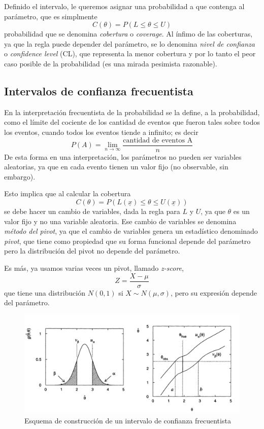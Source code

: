 \documentclass{article}
\numberwithin{equation}{section} %
\begin{document}
Definido el intervalo, le queremos asignar una probabilidad a que contenga al parámetro, que es simplmente
\begin{equation}
C(\theta) = P(L \leq \theta \leq U)
\end{equation}
probabilidad que se denomina \emph{cobertura} o \emph{coverage}. Al ínfimo de las coberturas, ya que la regla puede depender del parámetro, se lo denomina \emph{nivel de confianza} o \emph{confidence level} (CL), que representa la menor cobertura y por lo tanto el peor caso posible de la probabilidad (es una mirada pesimista razonable). 

\subsection{Intervalos de confianza frecuentista}
En la interpretación frecuentista de la probabilidad se la define, a la probabilidad, como el límite del cociente de los cantidad de eventos que fueron tales sobre todos los eventos, cuando todos los eventos tiende a infinito; es decir
\begin{equation}
P(A) = \lim_{n \to \infty} \frac{\text{cantidad de eventos A}}{n}
\end{equation}
De esta forma en una interpretación, los parámetros no pueden ser variables aleatorias, ya que en cada evento tienen un valor fijo (no observable, sin embargo).

Esto implica que al calcular la cobertura
\[C(\theta) = P(L(\underline{x}) \leq \theta \leq U(\underline{x}))\]
se debe hacer un cambio de variables, dada la regla para $L$ y $U$, ya que $\theta$ es un valor fijo y no una variable aleatoria. Ese cambio de variables se denomina \emph{método del pivot}, ya que el cambio de variables genera un estadístico denominado \emph{pivot}, que tiene como propiedad que su forma funcional depende del parámetro pero la distribución del pivot no depende del parámetro.

Es más, ya usamos varias veces un pivot, llamado \emph{z-score},
\begin{equation}
Z = \frac{X - \mu}{\sigma}
\end{equation}
que tiene una distribución $N(0,1)$ si $X \sim N(\mu, \sigma)$, pero su expresión depende del parámetro.


\begin{figure}[H]
\centering
\includegraphics[scale=0.4]{CL_freq}
\caption{Esquema de construcción de un intervalo de confianza frecuentista}
\label{fig:cl_freq}
\end{figure}
\end{document}
